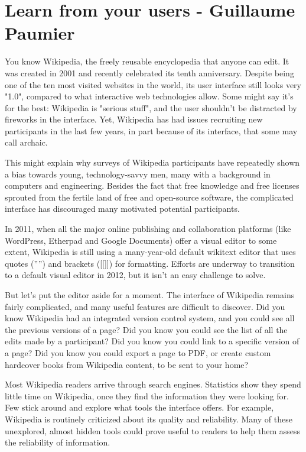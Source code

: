 \section{Learn from your users - Guillaume Paumier}
You know Wikipedia, the freely reusable encyclopedia that anyone can edit. It was created in 2001 and recently celebrated its tenth anniversary. Despite being one of the ten most visited websites in the world, its user interface still looks very "1.0", compared to what interactive web technologies allow. Some might say it's for the best: Wikipedia is "serious stuff", and the user shouldn't be distracted by fireworks in the interface. Yet, Wikipedia has had issues recruiting new participants in the last few years, in part because of its interface, that some may call archaic.

This might explain why surveys of Wikipedia participants have repeatedly shown a bias towards young, technology-savvy men, many with a background in computers and engineering. Besides the fact that free knowledge and free licenses sprouted from the fertile land of free and open-source software, the complicated interface has discouraged many motivated potential participants.

In 2011, when all the major online publishing and collaboration platforms (like WordPress, Etherpad and Google Documents) offer a visual editor to some extent, Wikipedia is still using a many-year-old default wikitext editor that uses quotes ('''') and brackets ([[]]) for formatting. Efforts are underway to transition to a default visual editor in 2012, but it isn't an easy challenge to solve.

But let's put the editor aside for a moment. The interface of Wikipedia remains fairly complicated, and many useful features are difficult to discover. Did you know Wikipedia had an integrated version control system, and you could see all the previous versions of a page? Did you know you could see the list of all the edits made by a participant? Did you know you could link to a specific version of a page? Did you know you could export a page to PDF, or create custom hardcover books from Wikipedia content, to be sent to your home?

Most Wikipedia readers arrive through search engines. Statistics show they spend little time on Wikipedia, once they find the information they were looking for. Few stick around and explore what tools the interface offers. For example, Wikipedia is routinely criticized about its quality and reliability. Many of these unexplored, almost hidden tools could prove useful to readers to help them assess the reliability of information.

